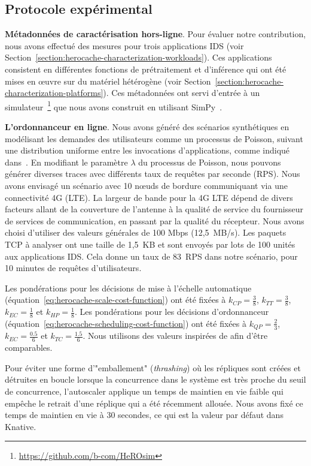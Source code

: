 \subsection{Protocole expérimental}

\textbf{Métadonnées de caractérisation hors-ligne}. Pour évaluer notre contribution, nous avons effectué des mesures pour trois applications IDS (voir Section~\ref{section:herocache-characterization-workloads}). Ces applications consistent en différentes fonctions de prétraitement et d'inférence qui ont été mises en œuvre sur du matériel hétérogène (voir Section~\ref{section:herocache-characterization-platforms}). Ces métadonnées ont servi d'entrée à un simulateur~\footnote{\href{https://github.com/b-com/HeROsim}{https://github.com/b-com/HeROsim}} que nous avons construit en utilisant SimPy~\cite{simpy}.

\textbf{L'ordonnanceur en ligne}. Nous avons généré des scénarios synthétiques en modélisant les demandes des utilisateurs comme un processus de Poisson, suivant une distribution uniforme entre les invocations d'applications, comme indiqué dans~\cite{9928755}. En modifiant le paramètre $\lambda$ du processus de Poisson, nous pouvons générer diverses traces avec différents taux de requêtes par seconde (RPS). Nous avons envisagé un scénario avec 10 nœuds de bordure communiquant via une connectivité 4G (LTE). La largeur de bande pour la 4G LTE dépend de divers facteurs allant de la couverture de l'antenne à la qualité de service du fournisseur de services de communication, en passant par la qualité du récepteur. Nous avons choisi d'utiliser des valeurs générales de 100 Mbps (12,5~MB/s). Les paquets TCP à analyser ont une taille de 1,5~KB et sont envoyés par lots de 100 unités aux applications IDS. Cela donne un taux de 83~RPS dans notre scénario, pour 10 minutes de requêtes d'utilisateurs. 

Les pondérations pour les décisions de mise à l'échelle automatique (équation~\ref{eq:herocache-scale-cost-function}) ont été fixées à $k_{CP} = \frac{3}{8}$, $k_{TT} = \frac{3}{8}$, $k_{EC} = \frac{1}{8}$ et $k_{HP} = \frac{1}{8}$. Les pondérations pour les décisions d'ordonnanceur (équation~\ref{eq:herocache-scheduling-cost-function}) ont été fixées à $k_{QP} = \frac{2}{3}$, $k_{EC} = \frac{0.5}{6}$ et $k_{TC} = \frac{1.5}{6}$. Nous utilisons des valeurs inspirées de \cite{herofake} afin d'être comparables.

Pour éviter une forme d'"emballement" (\textit{thrashing}) où les répliques sont créées et détruites en boucle lorsque la concurrence dans le système est très proche du seuil de concurrence, l'autoscaler applique un temps de maintien en vie faible qui empêche le retrait d'une réplique qui a été récemment allouée. Nous avons fixé ce temps de maintien en vie à 30 secondes, ce qui est la valeur par défaut dans Knative.

